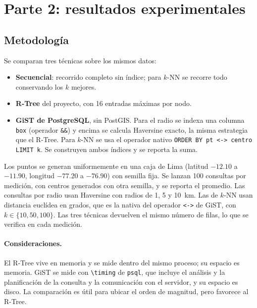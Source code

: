 \documentclass[11pt,a4paper]{article}
\begin{document}
\section{Parte 2: resultados experimentales}
\label{sec:exp-espacial}

\subsection{Metodología}

Se comparan tres técnicas sobre los mismos datos:
\begin{itemize}
  \item \textbf{Secuencial}: recorrido completo sin índice; para $k$-NN se recorre todo conservando los $k$ mejores.
  \item \textbf{R-Tree} del proyecto, con 16 entradas máximas por nodo.
  \item \textbf{GiST de PostgreSQL}, sin PostGIS. Para el radio se indexa una columna \texttt{box} (operador \texttt{\&\&}) y encima se calcula Haversine exacto, la misma estrategia que el R-Tree. Para $k$-NN se usa el operador nativo \texttt{ORDER BY pt <-> centro LIMIT k}. Se construyen ambos índices y se reporta la suma.
\end{itemize}

Los puntos se generan uniformemente en una caja de Lima (latitud $-12.10$ a $-11.90$, longitud $-77.20$ a $-76.90$) con semilla fija. Se lanzan 100 consultas por medición, con centros generados con otra semilla, y se reporta el promedio. Las consultas por radio usan Haversine con radios de 1, 5 y 10~km. Las de $k$-NN usan distancia euclídea en grados, que es la nativa del operador \texttt{<->} de GiST, con $k \in \{10, 50, 100\}$. Las tres técnicas devuelven el mismo número de filas, lo que se verifica en cada medición.

\paragraph{Consideraciones.} El R-Tree vive en memoria y se mide dentro del mismo proceso; su espacio es memoria. GiST se mide con \texttt{\textbackslash timing} de \texttt{psql}, que incluye el análisis y la planificación de la consulta y la comunicación con el servidor, y su espacio es disco. La comparación es útil para ubicar el orden de magnitud, pero favorece al R-Tree.
\end{document}
